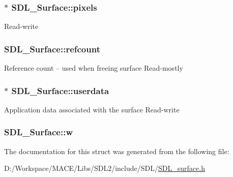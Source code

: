 \subsubsection[{\texorpdfstring{pixels}{pixels}}]{$\ast$ S\+D\+L\+\_\+\+Surface\+::pixels}\hypertarget{struct_s_d_l___surface_abd9597e0e084b8ef33fe0397bc26d911}{}\label{struct_s_d_l___surface_abd9597e0e084b8ef33fe0397bc26d911}
Read-\/write 
\subsubsection[{\texorpdfstring{refcount}{refcount}}]{ S\+D\+L\+\_\+\+Surface\+::refcount}\hypertarget{struct_s_d_l___surface_a03d10628a359c0674f5ceffd574f1641}{}\label{struct_s_d_l___surface_a03d10628a359c0674f5ceffd574f1641}
Reference count -- used when freeing surface Read-\/mostly 
\subsubsection[{\texorpdfstring{userdata}{userdata}}]{$\ast$ S\+D\+L\+\_\+\+Surface\+::userdata}\hypertarget{struct_s_d_l___surface_ae66d973dcb9b57cb34815892e1ee1f31}{}\label{struct_s_d_l___surface_ae66d973dcb9b57cb34815892e1ee1f31}
Application data associated with the surface Read-\/write 
\subsubsection[{\texorpdfstring{w}{w}}]{ S\+D\+L\+\_\+\+Surface\+::w}\hypertarget{struct_s_d_l___surface_a9b0ec7185dcdb2a3530a9160a6ea83d9}{}\label{struct_s_d_l___surface_a9b0ec7185dcdb2a3530a9160a6ea83d9}


The documentation for this struct was generated from the following file\+:\begin{DoxyCompactItemize}
\item 
D\+:/\+Workspace/\+M\+A\+C\+E/\+Libs/\+S\+D\+L2/include/\+S\+D\+L/\hyperlink{_s_d_l__surface_8h}{S\+D\+L\+\_\+surface.\+h}\end{DoxyCompactItemize}
